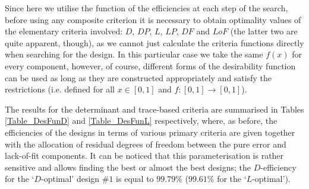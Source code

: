 Since here we utilise the function of the efficiencies at each step of the search, before using any composite criterion it is necessary to obtain optimality values of the elementary criteria involved: $D$, $DP$, $L$, $LP$, $DF$ and $LoF$ (the latter two are quite apparent, though), as we cannot just calculate the criteria functions directly when searching for the design. In this particular case we take the same $f(x)$ for every component, however, of course, different forms of the desirability function can be used as long as they are constructed appropriately and satisfy the restrictions (i.e. defined for all $x\in[0,1]$ and $f:[0,1]\rightarrow[0,1]$).    
 
The results for the determinant and trace-based criteria are summarised in Tables \ref{Table_DesFunD} and \ref{Table_DesFunL} respectively, where, as before, the efficiencies of the designs in terms of various primary criteria are given together with the allocation of residual degrees of freedom between the pure error and lack-of-fit components. It can be noticed that this parameterisation is rather sensitive and allows finding the best or almost the best designs; the $D$-efficiency for the `$D$-optimal' design \#$1$ is equal to $99.79\%$ ($99.61\%$ for the `$L$-optimal').

